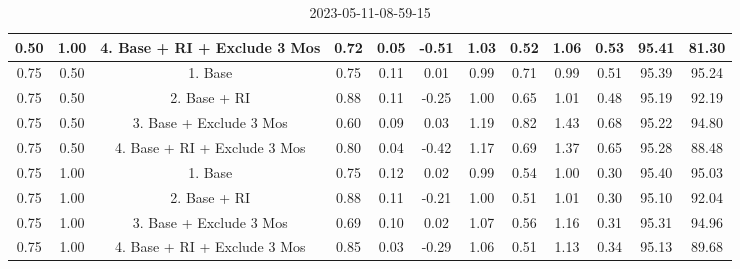 \documentclass{article}
\begin{document}
\begin{table}[ht]
\begin{tabular}{cccccccccccc}
  0.50 & 1.00 & 4. Base + RI + Exclude 3 Mos & 0.72 & 0.05 & -0.51 & 1.03 & 0.52 & 1.06 & 0.53 & 95.41 & 81.30 \\ 
   \hline 
0.75 & 0.50 & 1. Base & 0.75 & 0.11 & 0.01 & 0.99 & 0.71 & 0.99 & 0.51 & 95.39 & 95.24 \\ 
  0.75 & 0.50 & 2. Base + RI & 0.88 & 0.11 & -0.25 & 1.00 & 0.65 & 1.01 & 0.48 & 95.19 & 92.19 \\ 
  0.75 & 0.50 & 3. Base + Exclude 3 Mos & 0.60 & 0.09 & 0.03 & 1.19 & 0.82 & 1.43 & 0.68 & 95.22 & 94.80 \\ 
  0.75 & 0.50 & 4. Base + RI + Exclude 3 Mos & 0.80 & 0.04 & -0.42 & 1.17 & 0.69 & 1.37 & 0.65 & 95.28 & 88.48 \\ 
   \hline 
0.75 & 1.00 & 1. Base & 0.75 & 0.12 & 0.02 & 0.99 & 0.54 & 1.00 & 0.30 & 95.40 & 95.03 \\ 
  0.75 & 1.00 & 2. Base + RI & 0.88 & 0.11 & -0.21 & 1.00 & 0.51 & 1.01 & 0.30 & 95.10 & 92.04 \\ 
  0.75 & 1.00 & 3. Base + Exclude 3 Mos & 0.69 & 0.10 & 0.02 & 1.07 & 0.56 & 1.16 & 0.31 & 95.31 & 94.96 \\ 
  0.75 & 1.00 & 4. Base + RI + Exclude 3 Mos & 0.85 & 0.03 & -0.29 & 1.06 & 0.51 & 1.13 & 0.34 & 95.13 & 89.68 \\ 
   \hline 
 \hline
\end{tabular}
\caption{2023-05-11-08-59-15} 
\end{table}
\end{document}
